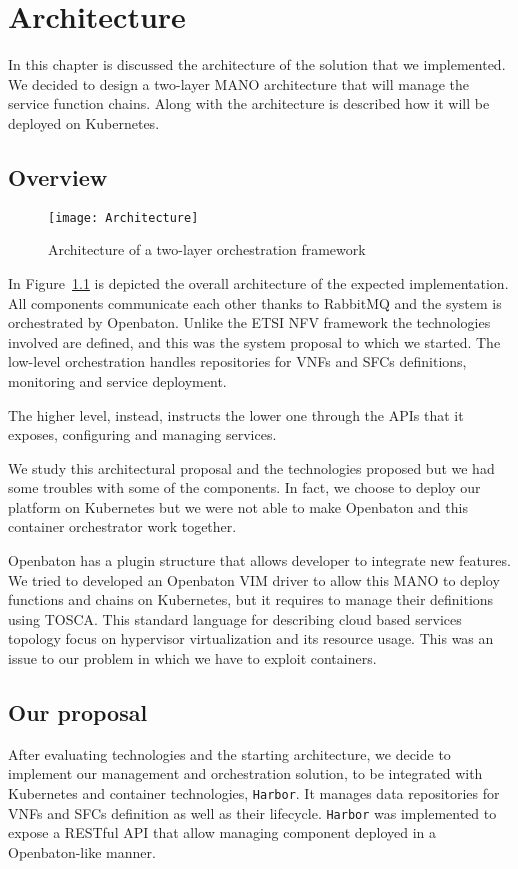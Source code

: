 \chapter{Architecture}
\label{chap:archimpl}
 
In this chapter is discussed the architecture of the solution that we
implemented. We decided to design a two-layer MANO architecture that will manage
the service function chains. Along with the architecture is described how it
will be deployed on Kubernetes.

\section{Overview}
\begin{figure}[H]
  \centering
  \texttt{[image: Architecture]}
  \caption{Architecture of a two-layer orchestration framework}
  \label{chap:archimpl:img:architecture}
\end{figure}
In Figure~\ref{chap:archimpl:img:architecture} is depicted the overall
architecture of the expected implementation. All components communicate each
other thanks to RabbitMQ and the system is orchestrated by Openbaton. Unlike the
ETSI NFV framework the technologies involved are defined, and this was the
system proposal to which we started. The low-level orchestration handles
repositories for VNFs and SFCs definitions, monitoring and service deployment.

The higher level, instead, instructs the lower one through the APIs that it
exposes, configuring and managing services. 

We study this architectural proposal and the technologies proposed but we had
some troubles with some of the components. In fact, we choose to deploy our
platform on Kubernetes but we were not able to make Openbaton and this container
orchestrator work together.

Openbaton has a plugin structure that allows developer to integrate new
features. We tried to developed an Openbaton VIM driver to allow this MANO to
deploy functions and chains on Kubernetes, but it requires to manage their
definitions using TOSCA. This standard language for describing cloud based
services topology focus on hypervisor virtualization and its resource usage.
This was an issue to our problem in which we have to exploit containers.

\section{Our proposal}
After evaluating technologies and the starting architecture, we decide to
implement our management and orchestration solution, to be integrated with
Kubernetes and container technologies, \texttt{Harbor}. It manages data
repositories for VNFs and SFCs definition as well as their lifecycle.
\texttt{Harbor} was implemented to expose a RESTful API that allow managing
component deployed in a Openbaton-like manner. 

